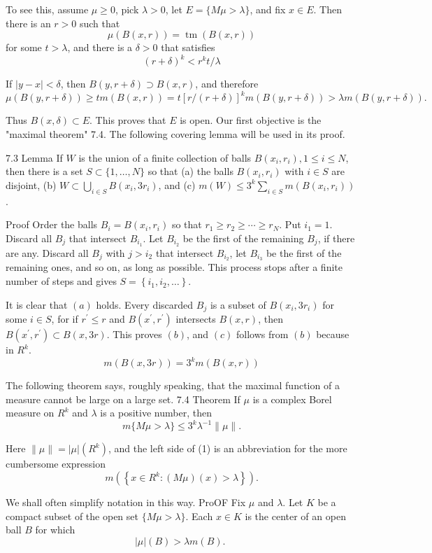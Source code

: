 To see this, assume $\mu \geq 0$, pick $\lambda>0$, let $E=\{M \mu>\lambda\}$, and fix $x \in E$. Then there is an $r>0$ such that
$$
\mu(B(x, r))=\operatorname{tm}(B(x, r))
$$
for some $t>\lambda$, and there is a $\delta>0$ that satisfies
$$
(r+\delta)^k<r^k t / \lambda
$$

If $|y-x|<\delta$, then $B(y, r+\delta) \supset B(x, r)$, and therefore
$$
\mu(B(y, r+\delta)) \geq t m(B(x, r))=t[r /(r+\delta)]^k m(B(y, r+\delta))>\lambda m(B(y, r+\delta)) .
$$

Thus $B(x, \delta) \subset E$. This proves that $E$ is open.
Our first objective is the "maximal theorem" 7.4. The following covering lemma will be used in its proof.

7.3 Lemma If $W$ is the union of a finite collection of balls $B\left(x_i, r_i\right), 1 \leq i \leq N$, then there is a set $S \subset\{1, \ldots, N\}$ so that
(a) the balls $B\left(x_i, r_i\right)$ with $i \in S$ are disjoint,
(b) $W \subset \bigcup_{i \in S} B\left(x_i, 3 r_i\right)$, and
(c) $m(W) \leq 3^k \sum_{i \in S} m\left(B\left(x_i, r_i\right)\right)$.

Proof Order the balls $B_i=B\left(x_i, r_i\right)$ so that $r_1 \geq r_2 \geq \cdots \geq r_N$. Put $i_1=1$. Discard all $B_j$ that intersect $B_{i_1}$. Let $B_{i_2}$ be the first of the remaining $B_j$, if there are any. Discard all $B_j$ with $j>i_2$ that intersect $B_{i_2}$, let $B_{i_3}$ be the first of the remaining ones, and so on, as long as possible. This process stops after a finite number of steps and gives $S=\left\{i_1, i_2, \ldots\right\}$.

It is clear that $(a)$ holds. Every discarded $B_j$ is a subset of $B\left(x_i, 3 r_i\right)$ for some $i \in S$, for if $r^{\prime} \leq r$ and $B\left(x^{\prime}, r^{\prime}\right)$ intersects $B(x, r)$, then $B\left(x^{\prime}, r^{\prime}\right) \subset B(x, 3 r)$. This proves $(b)$, and $(c)$ follows from $(b)$ because in $R^k$.
$$
m(B(x, 3 r))=3^k m(B(x, r))
$$

The following theorem says, roughly speaking, that the maximal function of a measure cannot be large on a large set.
7.4 Theorem If $\mu$ is a complex Borel measure on $R^k$ and $\lambda$ is a positive number, then
$$
m\{M \mu>\lambda\} \leq 3^k \lambda^{-1}\|\mu\| .
$$

Here $\|\mu\|=|\mu|\left(R^k\right)$, and the left side of (1) is an abbreviation for the more cumbersome expression
$$
m\left(\left\{x \in R^k:(M \mu)(x)>\lambda\right\}\right) .
$$

We shall often simplify notation in this way.
ProOF Fix $\mu$ and $\lambda$. Let $K$ be a compact subset of the open set $\{M \mu>\lambda\}$. Each $x \in K$ is the center of an open ball $B$ for which
$$
|\mu|(B)>\lambda m(B) \text {. }
$$

